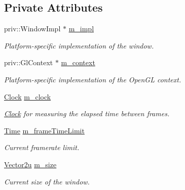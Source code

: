 \subsection*{Private Attributes}
\begin{DoxyCompactItemize}
\item 
\mbox{\label{classsf_1_1_window_afdb7af967081715c4be3358d3965e3ef}} 
priv\+::\+Window\+Impl $\ast$ \mbox{\hyperlink{classsf_1_1_window_afdb7af967081715c4be3358d3965e3ef}{m\+\_\+impl}}
\begin{DoxyCompactList}\small\item\em Platform-\/specific implementation of the window. \end{DoxyCompactList}\item 
\mbox{\label{classsf_1_1_window_abf0d9ab938d1890ee5caf57fab5eaa0a}} 
priv\+::\+Gl\+Context $\ast$ \mbox{\hyperlink{classsf_1_1_window_abf0d9ab938d1890ee5caf57fab5eaa0a}{m\+\_\+context}}
\begin{DoxyCompactList}\small\item\em Platform-\/specific implementation of the Open\+GL context. \end{DoxyCompactList}\item 
\mbox{\label{classsf_1_1_window_ab7722cfc3e60af5e0898c290bee34cb1}} 
\mbox{\hyperlink{classsf_1_1_clock}{Clock}} \mbox{\hyperlink{classsf_1_1_window_ab7722cfc3e60af5e0898c290bee34cb1}{m\+\_\+clock}}
\begin{DoxyCompactList}\small\item\em \mbox{\hyperlink{classsf_1_1_clock}{Clock}} for measuring the elapsed time between frames. \end{DoxyCompactList}\item 
\mbox{\label{classsf_1_1_window_a218e61a2bf154498c2f2f793b267cf6c}} 
\mbox{\hyperlink{classsf_1_1_time}{Time}} \mbox{\hyperlink{classsf_1_1_window_a218e61a2bf154498c2f2f793b267cf6c}{m\+\_\+frame\+Time\+Limit}}
\begin{DoxyCompactList}\small\item\em Current framerate limit. \end{DoxyCompactList}\item 
\mbox{\label{classsf_1_1_window_a65607b791306694d0f0a4cf2e8fc4559}} 
\mbox{\hyperlink{classsf_1_1_vector2}{Vector2u}} \mbox{\hyperlink{classsf_1_1_window_a65607b791306694d0f0a4cf2e8fc4559}{m\+\_\+size}}
\begin{DoxyCompactList}\small\item\em Current size of the window. \end{DoxyCompactList}\end{DoxyCompactItemize}
